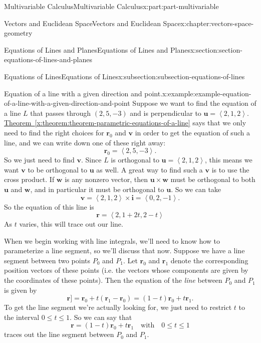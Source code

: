 \documentclass[twoside,10pt,]{tufte-book}
\newcommand{\xreffont}{\relax}
\numberwithin{equation}{part}
\newcommand{\dotprod}[1]{\left\langle #1 \right\rangle}
\begin{document}
\begin{partptx}{Multivariable Calculus}{}{Multivariable Calculus}{}{}{x:part:part-multivariable}
\begin{chapterptx}{Vectors and Euclidean Space}{}{Vectors and Euclidean Space}{}{}{x:chapter:vectors-space-geometry}
\begin{sectionptx}{Equations of Lines and Planes}{}{Equations of Lines and Planes}{}{}{x:section:section-equations-of-lines-and-planes}
\begin{subsectionptx}{Equations of Lines}{}{Equations of Lines}{}{}{x:subsection:subsection-equations-of-lines}
\begin{example}{Equation of a line with a given direction and point.}{x:example:example-equation-of-a-line-with-a-given-direction-and-point}
Suppose we want to find the equation of a line \(L\) that passes through \((2,5,-3)\) and is perpendicular to \(\mathbf{u} = \dotprod{2,1,2}\). \hyperref[x:theorem:theorem-parametric-equations-of-a-line]{Theorem~{\xreffont\ref{x:theorem:theorem-parametric-equations-of-a-line}}} says that we only need to find the right choices for \(\mathbf{r}_{0}\) and \(\mathbf{v}\) in order to get the equation of such a line, and we can write down one of these right away:%
%
\begin{equation*}
\mathbf{r}_{0} = \dotprod{2,5,-3}.
\end{equation*}
So we just need to find \(\mathbf{v}\). Since \(L\) is orthogonal to \(\mathbf{u} = \dotprod{2,1,2}\), this means we want \(\mathbf{v}\) to be orthogonal to \(\mathbf{u}\) as well. A great way to find such a \(\mathbf{v}\) is to use the cross product. If \(\mathbf{w}\) is any nonzero vector, then \(\mathbf{u}\times\mathbf{w}\) must be orthogonal to both \(\mathbf{u}\) and \(\mathbf{w}\), and in particular it must be orthogonal to \(\mathbf{u}\). So we can take%
%
\begin{equation*}
\mathbf{v} = \dotprod{2,1,2}\times\mathbf{i} = \dotprod{0,2,-1}.
\end{equation*}
So the equation of this line is%
%
\begin{equation*}
\mathbf{r} = \dotprod{2,1+2t,2-t}
\end{equation*}
As \(t\) varies, this will trace out our line.%
\end{example}
When we begin working with line integrals, we'll need to know how to parameterize a line segment, so we'll discuss that now. Suppose we have a line segment between two points \(P_{0}\) and \(P_{1}\). Let \(\mathbf{r}_{0}\) and \(\mathbf{r}_{1}\) denote the corresponding position vectors of these points (i.e. the vectors whose components are given by the coordinates of these points). Then the equation of the \emph{line} between \(P_{0}\) and \(P_{1}\) is given by%
%
\begin{equation*}
\mathbf{r}] = \mathbf{r}_{0}+t(\mathbf{r}_{1}-\mathbf{r}_{0}) = (1-t)\mathbf{r}_{0}+t\mathbf{r}_{1}.
\end{equation*}
To get the line segment we're actually looking for, we just need to restrict \(t\) to the interval \(0\leq t\leq 1\). So we can say that%
%
\begin{equation*}
\mathbf{r} = (1-t)\mathbf{r}_{0}+t\mathbf{r}_{1} \quad\text{with}\quad0\leq t\leq 1
\end{equation*}
traces out the line segment between \(P_{0}\) and \(P_{1}\).%

\end{subsectionptx}
\end{sectionptx}
\end{chapterptx}
\end{partptx}
\end{document}
